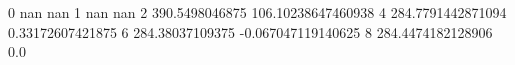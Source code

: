0 nan nan
1 nan nan
2 390.5498046875 106.10238647460938
4 284.7791442871094 0.33172607421875
6 284.38037109375 -0.067047119140625
8 284.4474182128906 0.0

